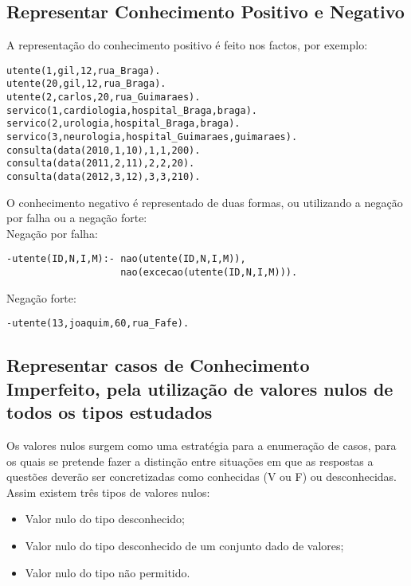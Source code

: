 \subsection{Representar Conhecimento Positivo e Negativo}

A representação do conhecimento positivo é feito nos factos, por exemplo:

\begin{verbatim}
utente(1,gil,12,rua_Braga).
utente(20,gil,12,rua_Braga).
utente(2,carlos,20,rua_Guimaraes).
servico(1,cardiologia,hospital_Braga,braga).
servico(2,urologia,hospital_Braga,braga).
servico(3,neurologia,hospital_Guimaraes,guimaraes). 
consulta(data(2010,1,10),1,1,200).
consulta(data(2011,2,11),2,2,20).
consulta(data(2012,3,12),3,3,210).
\end{verbatim}

O conhecimento negativo é representado de duas formas, ou utilizando a negação por falha ou a negação forte: \\


Negação por falha: 
\begin{verbatim}
-utente(ID,N,I,M):- nao(utente(ID,N,I,M)),
					nao(excecao(utente(ID,N,I,M))).
\end{verbatim}

Negação forte: 
\begin{verbatim}
-utente(13,joaquim,60,rua_Fafe). 
\end{verbatim}



\subsection{Representar casos de Conhecimento Imperfeito, pela utilização de valores nulos de todos os tipos estudados}

Os valores nulos surgem como uma estratégia para a enumeração de casos, para os quais se pretende fazer a distinção entre situações em que as respostas a questões deverão ser concretizadas como conhecidas (V ou F) ou desconhecidas. 
Assim existem três tipos de valores nulos:

\begin{itemize}
	\item Valor nulo do tipo desconhecido;	
	\item Valor nulo do tipo desconhecido de um conjunto dado de valores;
	\item Valor nulo do tipo não permitido. 
\end{itemize}

